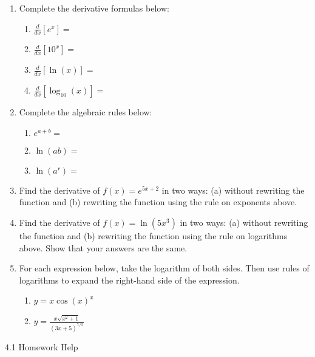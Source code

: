 \documentclass[11pt,fleqn]{article}
\begin{document}
 \begin{enumerate}
 \item Complete the derivative formulas below:
 \begin{multicols}{2}
 \begin{enumerate}
 	\item $\displaystyle{\frac{d}{dx} \left[e^x \right]=}$
	\item $\displaystyle{\frac{d}{dx} \left[10^x \right]=}$
	\item $\displaystyle{\frac{d}{dx} \left[\ln(x) \right]=}$
	\item $\displaystyle{\frac{d}{dx} \left[\log_{10}(x) \right]=}$
\end{enumerate}
\end{multicols}
\item Complete the algebraic rules below:
 \begin{multicols}{2}
 \begin{enumerate}
 	\item $\displaystyle{e^{a+b}=}$
	\item $\displaystyle{\ln(ab)=}$
	\item $\displaystyle{\ln(a^r)=}$
\end{enumerate}
\end{multicols}
\item Find the derivative of $f(x)=e^{5x+2}$ in two ways: (a) without rewriting the function and (b) rewriting the function using the rule on exponents above.
\vfill
\item Find the derivative of $f(x)=\ln(5x^3)$ in two ways: (a) without rewriting the function and (b) rewriting the function using the rule on logarithms above. Show that your answers are the same.
\vfill
\item For each expression below, take the logarithm of both sides. Then use rules of logarithms to expand the right-hand side of the expression.
\begin{enumerate}
	\item $y= x \cos(x)^{x}$
	\vfill
	\item $y=\frac{x\sqrt{x^2+1}}{(3x+5)^{7/5}}$
	\vfill
 \end{enumerate}
 \end{enumerate}
 \newpage
 \begin{center} 4.1 Homework Help \end{center}
\end{document}
